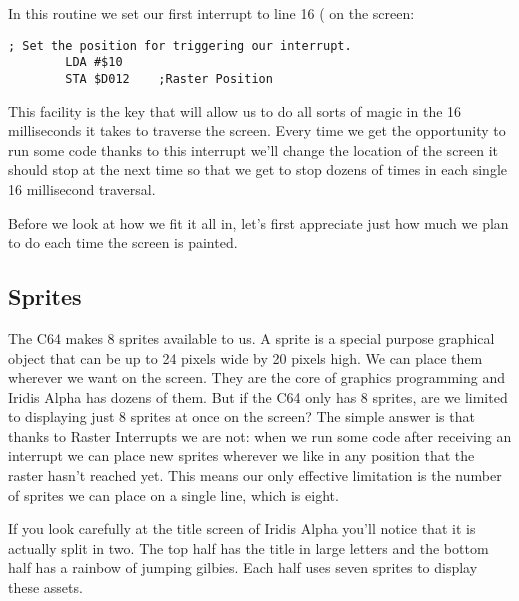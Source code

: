 In this routine we set our first interrupt to line 16 ( on the screen:

\begin{lstlisting}[caption=In \icode{InitializeSpritesAndInterruptsForTitleScreen}]
        ; Set the position for triggering our interrupt.
        LDA #$10
        STA $D012    ;Raster Position
\end{lstlisting}

This facility is the key that will allow us to do all sorts of magic in the 16 milliseconds
it takes to traverse the screen. Every time we get the opportunity to run some code thanks
to this interrupt we'll change the location of the screen it should stop at the next time
so that we get to stop dozens of times in each single 16 millisecond traversal.

Before we look at how we fit it all in, let's first appreciate just how much we plan to
do each time the screen is painted.

\subsection{Sprites}
The C64 makes 8 sprites available to us. A sprite is a special purpose graphical object that
can be up to 24 pixels wide by 20 pixels high. We can place them wherever we want on the
screen. They are the core of graphics programming and Iridis Alpha has dozens of them. But
if the C64 only has 8 sprites, are we limited to displaying just 8 sprites at once on the
screen? The simple answer is that thanks to Raster Interrupts we are not: when we run
some code after receiving an interrupt we can place new sprites wherever we like in any
position that the raster hasn't reached yet. This means our only effective limitation is
the number of sprites we can place on a single line, which is eight. 

If you look carefully at the title screen of Iridis Alpha you'll notice that it is actually
split in two. The top half has the title in large letters and the bottom half has a rainbow
of jumping gilbies. Each half uses seven sprites to display these assets.



